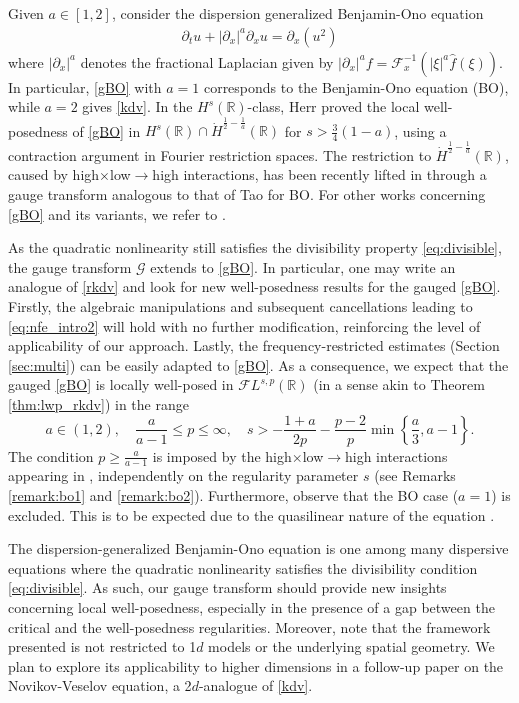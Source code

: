 \documentclass[a4paper,
11pt,  reqno]{amsart}
\newcommand{\5}{\textup{V}}
\newcommand{\FL}{\mathcal{F} L}
\newcommand{\ft}{\widehat}
\newcommand{\dx}{\partial_x}
\newcommand{\dt}{\partial_t}
\theoremstyle{remark}
\newcommand{\R}{\mathbb{R}}
\newcommand{\Ft}{{\mathcal{F}}}
\newcommand{\Gc}{\mathcal{G}}
\numberwithin{equation}{section}
\numberwithin{theorem}{section}
\begin{document}
Given $a \in [1,2]$, consider the dispersion generalized Benjamin-Ono equation
\begin{align}
\label{gBO}\tag{dgBO}
\dt u + |\dx|^a \dx u = \dx (u^2)
\end{align}
where $|\dx|^a$ denotes the fractional Laplacian given by $|\dx|^a f = \Ft_{x}^{-1} (|\xi|^a \ft f (\xi))$.
In particular, \eqref{gBO} with $a=1$ corresponds to the Benjamin-Ono equation (BO), while $a=2$ gives \eqref{kdv}. In the $H^s(\R)$-class, Herr \cite{herr_bo} proved the local well-posedness of \eqref{gBO} in $H^s (\R) \cap \dot H^{\frac12-\frac 1a}(\R)$ for $s>\frac{3}{4}(1-a)$, using a contraction argument in Fourier restriction spaces. The restriction to $\dot H^{\frac12-\frac 1a}(\R)$, caused by high$\times$low$\to$high interactions, has been recently lifted in \cite{AiLiu} through a gauge transform analogous to that of Tao \cite{tao_bo} for BO. For other works concerning \eqref{gBO} and its variants, we refer to \cite{CamposLinaresSantos, FarahLinaresPastor_bo, Jockel, KenigMartelRobbiano}.

As the quadratic nonlinearity still satisfies the divisibility property \eqref{eq:divisible},  the gauge transform $\Gc$ extends to \eqref{gBO}.
In particular, one may write an analogue of \eqref{rkdv} and look for new well-posedness results for the gauged \eqref{gBO}. Firstly, the algebraic manipulations and subsequent cancellations leading to \eqref{eq:nfe_intro2} will hold with no further modification, reinforcing the level of applicability of our approach. Lastly, the frequency-restricted estimates (Section \ref{sec:multi}) can be easily adapted to \eqref{gBO}. As a consequence, we expect that the gauged \eqref{gBO} is locally well-posed in $\FL^{s,p}(\R)$ (in a sense akin to Theorem \ref{thm:lwp_rkdv}) in the range
\begin{equation}\label{eq:condicoes_bo}
a\in (1,2),\quad \frac{a}{a-1}\le p \le \infty,\quad s>-\frac{1+a}{2p} - \frac{p-2}{p}\min\left\{\frac{a}3, a-1\right\}.
\end{equation}
The condition $p\ge \frac{a}{a-1}$ is imposed by the high$\times$low$\to$high interactions appearing in \cite{herr_bo}, independently on the regularity parameter $s$ (see Remarks \ref{remark:bo1} and \ref{remark:bo2}). Furthermore, observe that the BO case ($a=1$) is excluded. This is to be expected due to the quasilinear nature of the equation \cite{KochTzvetkov_bo}.



\bigskip

The dispersion-generalized Benjamin-Ono equation is one among many dispersive equations where the quadratic nonlinearity satisfies the divisibility condition \eqref{eq:divisible}. As such, our gauge transform should provide new insights concerning local well-posedness, especially in the presence of a gap between the critical and the well-posedness regularities.
Moreover, note that the framework presented is not restricted to 1$d$ models or the underlying spatial geometry.
We plan to explore its applicability to higher dimensions in a follow-up paper \cite{CCR-NV} on the Novikov-Veselov equation, a 2$d$-analogue of \eqref{kdv}.
\end{document}
